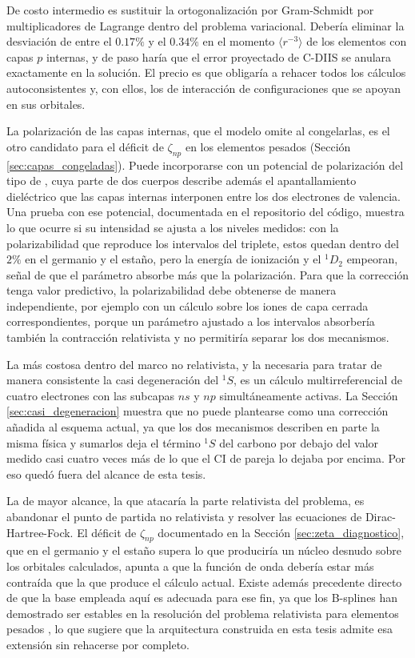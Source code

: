 De costo intermedio es sustituir la ortogonalización por Gram-Schmidt por multiplicadores de Lagrange dentro del problema variacional. Debería eliminar la desviación de entre el $0.17\%$ y el $0.34\%$ en el momento $\langle r^{-3} \rangle$ de los elementos con capas $p$ internas, y de paso haría que el error proyectado de C-DIIS se anulara exactamente en la solución. El precio es que obligaría a rehacer todos los cálculos autoconsistentes y, con ellos, los de interacción de configuraciones que se apoyan en sus orbitales.

La polarización de las capas internas, que el modelo omite al congelarlas, es el otro candidato para el déficit de $\zeta_{np}$ en los elementos pesados (Sección \ref{sec:capas_congeladas}). Puede incorporarse con un potencial de polarización del tipo de \textcite{Muller1984}, cuya parte de dos cuerpos describe además el apantallamiento dieléctrico que las capas internas interponen entre los dos electrones de valencia. Una prueba con ese potencial, documentada en el repositorio del código, muestra lo que ocurre si su intensidad se ajusta a los niveles medidos: con la polarizabilidad que reproduce los intervalos del triplete, estos quedan dentro del $2\%$ en el germanio y el estaño, pero la energía de ionización y el $^1D_2$ empeoran, señal de que el parámetro absorbe más que la polarización. Para que la corrección tenga valor predictivo, la polarizabilidad debe obtenerse de manera independiente, por ejemplo con un cálculo sobre los iones de capa cerrada correspondientes, porque un parámetro ajustado a los intervalos absorbería también la contracción relativista y no permitiría separar los dos mecanismos.

La más costosa dentro del marco no relativista, y la necesaria para tratar de manera consistente la casi degeneración del $^1S$, es un cálculo multirreferencial de cuatro electrones con las subcapas $ns$ y $np$ simultáneamente activas. La Sección \ref{sec:casi_degeneracion} muestra que no puede plantearse como una corrección añadida al esquema actual, ya que los dos mecanismos describen en parte la misma física y sumarlos deja el término $^1S$ del carbono por debajo del valor medido casi cuatro veces más de lo que el CI de pareja lo dejaba por encima. Por eso quedó fuera del alcance de esta tesis.

La de mayor alcance, la que atacaría la parte relativista del problema, es abandonar el punto de partida no relativista y resolver las ecuaciones de Dirac-Hartree-Fock. El déficit de $\zeta_{np}$ documentado en la Sección \ref{sec:zeta_diagnostico}, que en el germanio y el estaño supera lo que produciría un núcleo desnudo sobre los orbitales calculados, apunta a que la función de onda debería estar más contraída que la que produce el cálculo actual. Existe además precedente directo de que la base empleada aquí es adecuada para ese fin, ya que los B-splines han demostrado ser estables en la resolución del problema relativista para elementos pesados \parencite{Johnson1988}, lo que sugiere que la arquitectura construida en esta tesis admite esa extensión sin rehacerse por completo.

